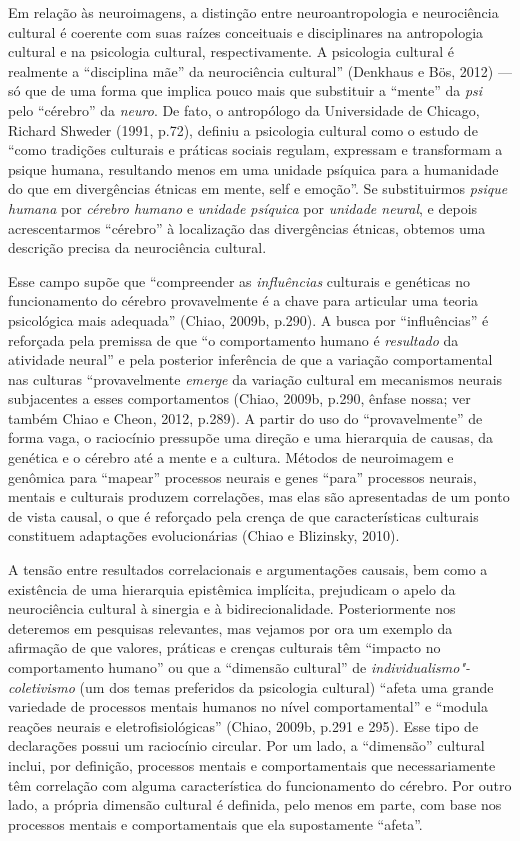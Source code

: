 Em relação às neuroimagens, a distinção entre neuroantropologia e
neurociência cultural é coerente com suas raízes conceituais e
disciplinares na antropologia cultural e na psicologia cultural,
respectivamente. A psicologia cultural é realmente a ``disciplina mãe''
da neurociência cultural'' (Denkhaus e Bös, 2012) --- só que de uma
forma que implica pouco mais que substituir a ``mente'' da \emph{psi}
pelo ``cérebro'' da \emph{neuro}. De fato, o antropólogo da Universidade
de Chicago, Richard Shweder (1991, p.72), definiu a psicologia cultural
como o estudo de ``como tradições culturais e práticas sociais regulam,
expressam e transformam a psique humana, resultando menos em uma unidade
psíquica para a humanidade do que em divergências étnicas em mente, self
e emoção''. Se substituirmos \emph{psique humana} por \emph{cérebro
humano} e \emph{unidade psíquica} por \emph{unidade neural}, e depois
acrescentarmos ``cérebro'' à localização das divergências étnicas,
obtemos uma descrição precisa da neurociência cultural.

Esse campo supõe que ``compreender as \emph{influências} culturais e
genéticas no funcionamento do cérebro provavelmente é a chave para
articular uma teoria psicológica mais adequada'' (Chiao, 2009b, p.290).
A busca por ``influências'' é reforçada pela premissa de que ``o
comportamento humano é \emph{resultado} da atividade neural'' e pela
posterior inferência de que a variação comportamental nas culturas
``provavelmente \emph{emerge} da variação cultural em mecanismos neurais
subjacentes a esses comportamentos (Chiao, 2009b, p.290, ênfase nossa;
ver também Chiao e Cheon, 2012, p.289). A partir do uso do
``provavelmente'' de forma vaga, o raciocínio pressupõe uma direção e
uma hierarquia de causas, da genética e o cérebro até a mente e a
cultura. Métodos de neuroimagem e genômica para ``mapear'' processos
neurais e genes ``para'' processos neurais, mentais e culturais produzem
correlações, mas elas são apresentadas de um ponto de vista causal, o
que é reforçado pela crença de que características culturais constituem
adaptações evolucionárias (Chiao e Blizinsky, 2010).

A tensão entre resultados correlacionais e argumentações causais, bem
como a existência de uma hierarquia epistêmica implícita, prejudicam o
apelo da neurociência cultural à sinergia e à bidirecionalidade.
Posteriormente nos deteremos em pesquisas relevantes, mas vejamos por
ora um exemplo da afirmação de que valores, práticas e crenças culturais
têm ``impacto no comportamento humano'' ou que a ``dimensão cultural''
de \emph{individualismo"-coletivismo} (um dos temas preferidos da
psicologia cultural) ``afeta uma grande variedade de processos mentais
humanos no nível comportamental'' e ``modula reações neurais e
eletrofisiológicas'' (Chiao, 2009b, p.291 e 295). Esse tipo de
declarações possui um raciocínio circular. Por um lado, a ``dimensão''
cultural inclui, por definição, processos mentais e comportamentais que
necessariamente têm correlação com alguma característica do
funcionamento do cérebro. Por outro lado, a própria dimensão cultural é
definida, pelo menos em parte, com base nos processos mentais e
comportamentais que ela supostamente ``afeta''.

